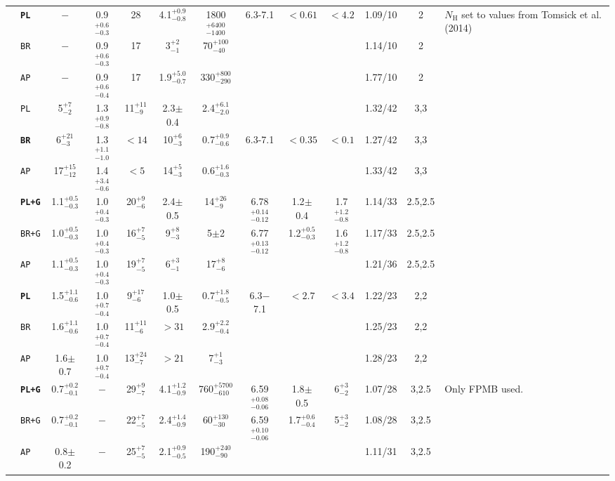 \documentclass[iop,revtex4]{emulateapj}
\newcommand\M{\rule{0pt}{2.3ex}}
\newcommand\U{\rule{0pt}{3.2ex}}       %
\newcommand\D{\rule[-2.4ex]{0pt}{0pt}} %
\begin{document}
\begin{landscape}
\begin{longtable}{cp{0.6in}ccccccccccp{1.7in}}
\U\multirow{3}{*}{10}&\textbf{\texttt{PL}}&$-$&0.9$^{+0.6}_{-0.3}$&28&4.1$^{+0.9}_{-0.8}$&1800$^{+6400}_{-1400}$ &6.3-7.1&$<0.61$&$<4.2$&1.09/10&2&\multirow{3}{1.7in}{$N_{\mathrm{H}}$ set to values from Tomsick et al. (2014)}\\
\M&\texttt{BR}&$-$&0.9$^{+0.6}_{-0.3}$&17&3$^{+2}_{-1}$&70$^{+100}_{-40}$&&&&1.14/10&2&\\
\M\D&\texttt{AP}&$-$&0.9$^{+0.6}_{-0.4}$&17&1.9$^{+5.0}_{-0.7}$&330$^{+800}_{-290}$&&&&1.77/10&2&\\
\cline{13-13}

\U\multirow{3}{*}{11}&\texttt{PL}&5$^{+7}_{-2}$&1.3$^{+0.9}_{-0.8}$&11$^{+11}_{-9}$&2.3$\pm$0.4&2.4$^{+6.1}_{-2.0}$&&&&1.32/42&3,3&\\
\M&\textbf{\texttt{BR}}&6$^{+21}_{-3}$&1.3$^{+1.1}_{-1.0}$&$<14$&10$^{+6}_{-3}$&0.7$^{+0.9}_{-0.6}$&6.3-7.1&$<0.35$&$<0.1$&1.27/42&3,3&\\
\M\D&\texttt{AP}&17$^{+15}_{-12}$&1.4$^{+3.4}_{-0.6}$&$<5$&14$^{+5}_{-3}$&0.6$^{+1.6}_{-0.3}$&&&&1.33/42&3,3&\\
\cline{13-13}


\U\multirow{3}{*}{12}&\textbf{\texttt{PL+G}}&1.1$^{+0.5}_{-0.3}$&1.0$^{+0.4}_{-0.3}$&20$^{+9}_{-6}$&2.4$\pm$0.5&14$^{+26}_{-9}$ &6.78$^{+0.14}_{-0.12}$&1.2$\pm$0.4&1.7$^{+1.2}_{-0.8}$&1.14/33&2.5,2.5&\\
\M&\texttt{BR+G}&1.0$^{+0.5}_{-0.3}$&1.0$^{+0.4}_{-0.3}$&16$^{+7}_{-5}$&9$^{+8}_{-3}$&5$\pm$2 &6.77$^{+0.13}_{-0.12}$&1.2$^{+0.5}_{-0.3}$&1.6$^{+1.2}_{-0.8}$&1.17/33&2.5,2.5&\\
\M\D&\texttt{AP}&1.1$^{+0.5}_{-0.3}$&1.0$^{+0.4}_{-0.3}$&19$^{+7}_{-5}$&6$^{+3}_{-1}$&17$^{+8}_{-6}$&&&&1.21/36&2.5,2.5&\\
\cline{13-13}

\U\multirow{3}{*}{13}&\textbf{\texttt{PL}}&1.5$^{+1.1}_{-0.6}$&1.0$^{+0.7}_{-0.4}$&9$^{+17}_{-6}$&1.0$\pm$0.5&0.7$^{+1.8}_{-0.5}$ &6.3$-$7.1&$<2.7$&$<3.4$&1.22/23&2,2&\\
\M&\texttt{BR}&1.6$^{+1.1}_{-0.6}$&1.0$^{+0.7}_{-0.4}$&11$^{+11}_{-6}$&$>31$&2.9$^{+2.2}_{-0.4}$&&&&1.25/23&2,2&\\
\M\D&\texttt{AP}&1.6$\pm$0.7&1.0$^{+0.7}_{-0.4}$&13$^{+24}_{-7}$&$>21$&7$^{+1}_{-3}$&&&&1.28/23&2,2&\\
\cline{13-13}

\U\multirow{3}{*}{14}&\textbf{\texttt{PL+G}}&0.7$^{+0.2}_{-0.1}$&$-$&29$^{+9}_{-7}$&4.1$^{+1.2}_{-0.9}$&760$^{+5700}_{-610}$ &6.59$^{+0.08}_{-0.06}$&1.8$\pm$0.5&6$^{+3}_{-2}$&1.07/28&3,2.5&\multirow{3}{1.7in}{Only FPMB used.}\\ 
\M&\texttt{BR+G}&0.7$^{+0.2}_{-0.1}$&$-$&22$^{+7}_{-5}$&2.4$^{+1.4}_{-0.9}$&60$^{+130}_{-30}$& 6.59$^{+0.10}_{-0.06}$&1.7$^{+0.6}_{-0.4}$&5$^{+3}_{-2}$&1.08/28&3,2.5&\\
\M\D&\texttt{AP}&0.8$\pm$0.2&$-$&25$^{+7}_{-5}$&2.1$^{+0.9}_{-0.5}$&190$^{+240}_{-90}$&&&&1.11/31&3,2.5&\\
\cline{13-13}


\end{longtable}
\end{landscape}
\end{document}
